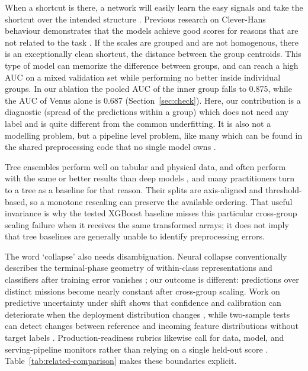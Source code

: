 \documentclass[preprint,12pt,authoryear]{elsarticle}
\begin{document}
When a shortcut is there, a network will easily learn the easy signals and take the shortcut over the intended structure \citep{geirhos2020,shah2020}. Previous research on Clever-Hans behaviour demonstrates that the models achieve good scores for reasons that are not related to the task \citep{lapuschkin2019}. If the scales are grouped and are not homogenous, there is an exceptionally clean shortcut, the distance between the group centroids. This type of model can memorize the difference between groups, and can reach a high AUC on a mixed validation set while performing no better inside individual groups. In our ablation the pooled AUC of the inner group falls to 0.875, while the AUC of Venus alone is 0.687 (Section~\ref{sec:check}). Here, our contribution is a diagnostic (spread of the predictions within a group) which does not need any label and is quite different from the common underfitting. It is also not a modelling problem, but a pipeline level problem, like many which can be found in the shared preprocessing code that no single model owns \citep{chaudhary2018}.

Tree ensembles perform well on tabular and physical data, and often perform with the same or better results than deep models \citep{chen2016,grinsztajn2022,shwartz2022,ke2017,pasaribu2024}, and many practitioners turn to a tree as a baseline for that reason. Their splits are axis-aligned and threshold-based, so a monotone rescaling can preserve the available ordering. That useful invariance is why the tested XGBoost baseline misses this particular cross-group scaling failure when it receives the same transformed arrays; it does not imply that tree baselines are generally unable to identify preprocessing errors.

The word `collapse' also needs disambiguation. Neural collapse conventionally describes the terminal-phase geometry of within-class representations and classifiers after training error vanishes \citep{papyan2020}; our outcome is different: predictions over distinct missions become nearly constant after cross-group scaling. Work on predictive uncertainty under shift shows that confidence and calibration can deteriorate when the deployment distribution changes \citep{ovadia2019}, while two-sample tests can detect changes between reference and incoming feature distributions without target labels \citep{rabanser2019}. Production-readiness rubrics likewise call for data, model, and serving-pipeline monitors rather than relying on a single held-out score \citep{breck2017}. Table~\ref{tab:related-comparison} makes these boundaries explicit.
\end{document}

